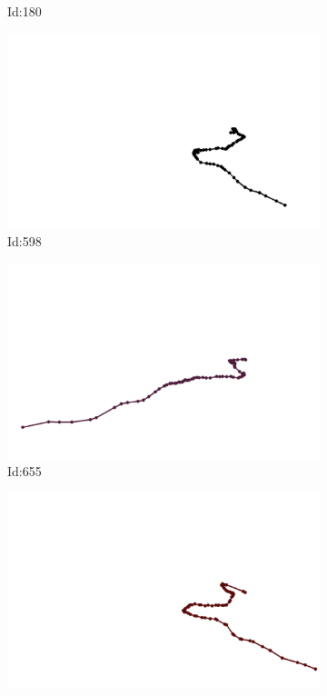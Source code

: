 \documentclass[12pt,twoside]{report}
\begin{document}
\begin{figure}
\begin{subfigure}[b]{0.20\textwidth}
\caption{Id:180}
\end{subfigure}
\begin{subfigure}[b]{0.20\textwidth}
\centering
\includegraphics[width=\textwidth]{../../trajectories/598.png}
\caption{Id:598}
\end{subfigure}
\begin{subfigure}[b]{0.20\textwidth}
\centering
\includegraphics[width=\textwidth]{../../trajectories/655.png}
\caption{Id:655}
\end{subfigure}
\begin{subfigure}[b]{0.20\textwidth}
\centering
\includegraphics[width=\textwidth]{../../trajectories/659.png}

\end{subfigure}
\end{figure}
\end{document}
